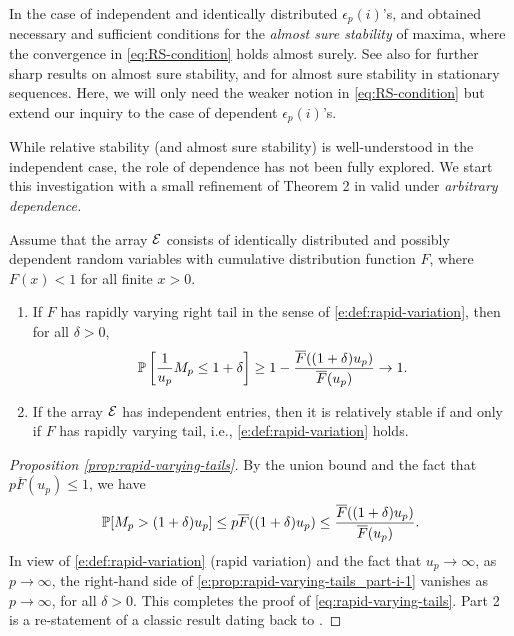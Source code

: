 In the case of independent and identically distributed $\epsilon_p(i)$'s, \citet{barndorff1963limit} and \citet{resnick1973almost} obtained necessary and sufficient conditions for the \emph{almost sure stability} of maxima, where the convergence in \eqref{eq:RS-condition} holds almost surely. See also \cite{klass:1984} for further sharp results on almost sure stability, and \cite{naveau2003almost} for almost sure stability in stationary sequences. 
Here, we will only need the weaker notion in \eqref{eq:RS-condition} but extend our inquiry to the case of dependent $\epsilon_p(i)$'s.

While relative stability (and almost sure stability) is well-understood in the independent case, the role of dependence has not been fully explored.
We start this investigation with a small refinement of Theorem 2 in \citet{gnedenko1943distribution} valid under {\em
arbitrary dependence.}

\begin{proposition} \label{prop:rapid-varying-tails}
Assume that the array ${\cal E}$ consists of identically distributed and possibly dependent random 
variables with cumulative distribution function $F$, where $F(x)<1$ for all finite $x>0$. 
\begin{enumerate}
    \item If $F$ has rapidly varying right tail in the sense of \eqref{e:def:rapid-variation}, then for all $\delta>0$,
        \begin{equation} \label{eq:rapid-varying-tails}
            \P\left[\frac{1}{u_p} M_p\le1+\delta\right] \ge 1 - \frac{\overline F((1+\delta)u_p)}{\overline F(u_p)} \to 1.
        \end{equation}
    \item If the array ${\cal E}$ has independent entries, then it is relatively stable if and only if $F$ has rapidly varying tail, i.e., \eqref{e:def:rapid-variation} holds.
    \label{prop:rapid-varying-tails_part-ii}
\end{enumerate}
\end{proposition}

\begin{proof}[Proposition \ref{prop:rapid-varying-tails}] 
By the union bound and the fact that 
$p\overline F(u_p) \le 1$, we have
\begin{align}\label{e:prop:rapid-varying-tails_part-i-1}
\P [ M_p > (1+\delta)u_p] \le p \overline F((1+\delta)u_p)
 \le \frac{\overline F((1+\delta)u_p)}{\overline F(u_p)}.
\end{align}
In view of \eqref{e:def:rapid-variation} (rapid variation) and the fact that $u_p\to\infty$, as $p\to\infty$, the right-hand side of \eqref{e:prop:rapid-varying-tails_part-i-1} vanishes 
as $p\to\infty$, for all $\delta>0$.  This completes the proof of \eqref{eq:rapid-varying-tails}. Part 2 is a re-statement of a classic result dating back to \cite{gnedenko1943distribution}.
\end{proof}

